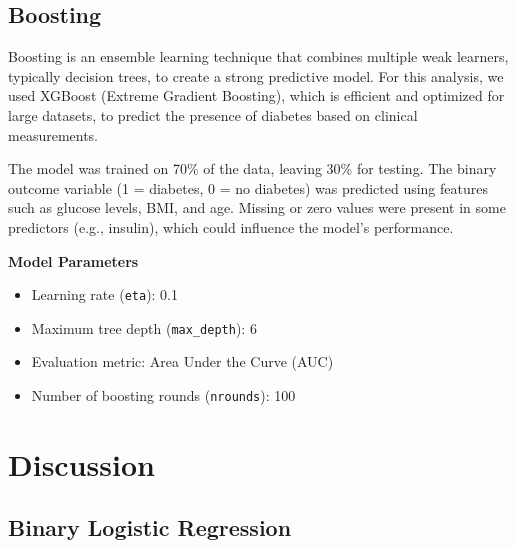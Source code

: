 \documentclass[12pt]{article}
\begin{document}
\subsection{Boosting}

Boosting \cite{chen2015xgboost} \cite{friedman2001greedy} is an ensemble learning technique that combines multiple weak learners, typically decision trees, to create a strong predictive model. For this analysis, we used XGBoost (Extreme Gradient Boosting), which is efficient and optimized for large datasets, to predict the presence of diabetes based on clinical measurements.

The model was trained on 70\% of the data, leaving 30\% for testing. The binary outcome variable (1 = diabetes, 0 = no diabetes) was predicted using features such as glucose levels, BMI, and age. Missing or zero values were present in some predictors (e.g., insulin), which could influence the model's performance.

\textbf{Model Parameters}
\begin{itemize}
	\item Learning rate (\texttt{eta}): 0.1
	\item Maximum tree depth (\texttt{max\_depth}): 6
	\item Evaluation metric: Area Under the Curve (AUC)
	\item Number of boosting rounds (\texttt{nrounds}): 100
\end{itemize}

\section{Discussion}
\subsection{Binary Logistic Regression}
\end{document}
